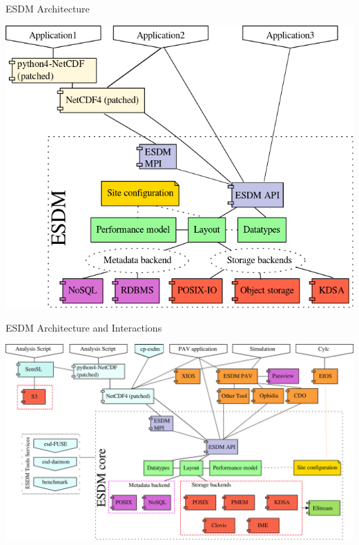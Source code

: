 \documentclass[compress,11pt,xcolor=svgnames,aspectratio=169]{beamer}
\begin{document}
\begin{frame}[fragile]{ESDM Architecture}

\begin{center}
\includegraphics[scale=0.35]{fig/esdm-arch1}
\end{center}

\end{frame}

\begin{frame}[fragile]{ESDM Architecture and Interactions}

\begin{center}
\includegraphics[scale=0.3]{fig/esdm-arch2}
\end{center}

\end{frame}
\end{document}
